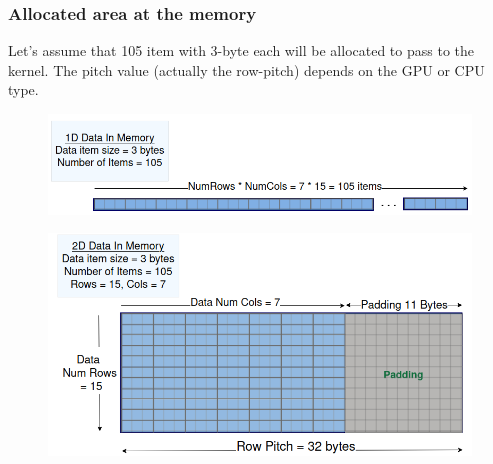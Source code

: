 \documentclass[9pt]{beamer}
\begin{document}
\begin{frame}[fragile]
\frametitle{Allocated area at the memory}
\hspace{-0.4\baselineskip}
\small
Let's assume that 105 item with 3-byte each will be allocated to pass to the kernel. The pitch value (actually the row-pitch) depends on the GPU or CPU type.

\begin{figure}
\hspace{-1.2\baselineskip}
   \centering
   \includegraphics[width=0.73\linewidth]{Screenshot from 2024-09-17 17-37-26.png}
   \label{fig:enter-label}
\end{figure}
\hspace{0.1\baselineskip}
\begin{figure}
\hspace{-1.2\baselineskip}
   \centering
   \includegraphics[width=0.75\linewidth]{Screenshot from 2024-09-17 17-36-44.png}
   \label{fig:enter-label}
\end{figure}
\end{frame}
\end{document}
